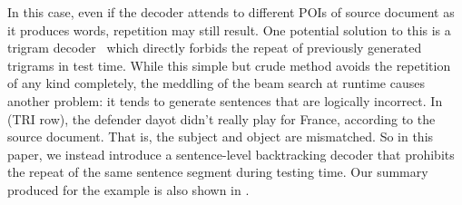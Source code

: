 In this case, even if the decoder attends to different POIs of 
source document as it produces words, repetition may still result.  
One potential solution to this is a trigram decoder~\cite{PaulusXS17} 
which directly forbids the repeat of previously generated trigrams in
test time. While this simple but crude method avoids the repetition of any kind
completely, the meddling of the beam search at runtime causes another problem: 
it tends to generate sentences that are logically incorrect. 
In  (TRI row), the defender dayot didn't
really play for France, according to the source document.
That is, the subject and object are mismatched.
So in this paper, we instead introduce a sentence-level backtracking decoder
that prohibits the repeat of the same sentence segment during testing time.
Our summary produced for the example is also shown in .

%


